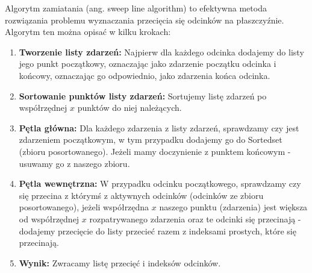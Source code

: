\quad Algorytm zamiatania (ang. sweep line algorithm) to efektywna metoda rozwiązania problemu wyznaczania przecięcia się odcinków na płaszczyźnie. Algorytm ten można opisać w kilku krokach:


\begin{enumerate}
    \item \textbf{Tworzenie listy zdarzeń:} Najpierw dla każdego odcinka dodajemy do listy jego punkt początkowy, oznaczając jako zdarzenie początku odcinka i końcowy, oznaczając go odpowiednio, jako zdarzenia końca odcinka.
    \item 
    \textbf{Sortowanie punktów listy zdarzeń:}
    Sortujemy listę zdarzeń po współrzędnej $x$ punktów do niej należących.
    
    \item  \textbf{Pętla główna:}
    Dla każdego zdarzenia z listy zdarzeń, sprawdzamy czy jest zdarzeniem początkowym, w tym przypadku dodajemy go do Sortedset (zbioru posortowanego). Jeżeli mamy doczynienie z punktem końcowym - usuwamy go z naszego zbioru.

\item  \textbf{Pętla wewnętrzna:}
W przypadku odcinku początkowego, sprawdzamy czy się przecina z którymś z aktywnych odcinków (odcinków ze zbioru posortowanego), jeżeli współrzędna $x$ naszego punktu (zdarzenia) jest większa od współrzędnej $x$ rozpatrywanego zdarzenia oraz te odcinki się przecinają - dodajemy przecięcie do listy przecieć razem z indeksami prostych, które się przecinają.

\item  \textbf{Wynik:}
Zwracamy listę przecięć i indeksów odcinków.
\end{enumerate}







